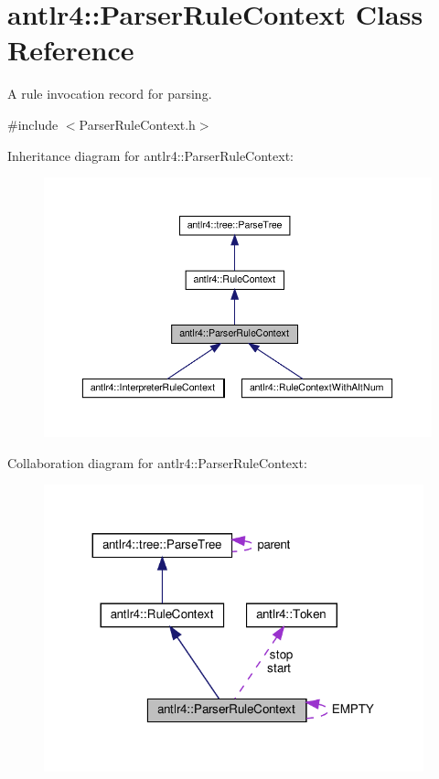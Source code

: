 \hypertarget{classantlr4_1_1ParserRuleContext}{}\section{antlr4\+:\+:Parser\+Rule\+Context Class Reference}
\label{classantlr4_1_1ParserRuleContext}


A rule invocation record for parsing.  




{\ttfamily \#include $<$Parser\+Rule\+Context.\+h$>$}



Inheritance diagram for antlr4\+:\+:Parser\+Rule\+Context\+:
\nopagebreak
\begin{figure}[H]
\begin{center}
\leavevmode
\includegraphics[width=350pt]{classantlr4_1_1ParserRuleContext__inherit__graph}
\end{center}
\end{figure}


Collaboration diagram for antlr4\+:\+:Parser\+Rule\+Context\+:
\nopagebreak
\begin{figure}[H]
\begin{center}
\leavevmode
\includegraphics[width=311pt]{classantlr4_1_1ParserRuleContext__coll__graph}
\end{center}
\end{figure}
